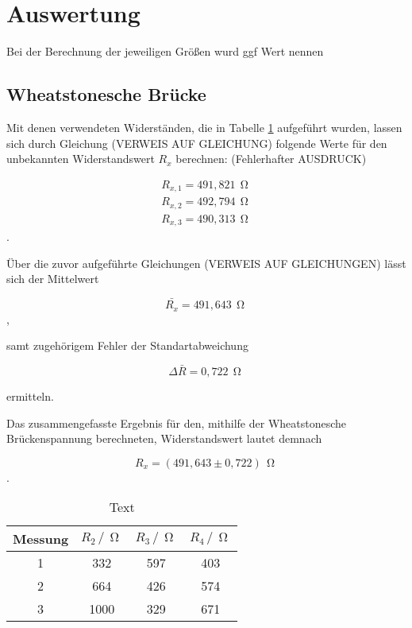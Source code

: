 \section{Auswertung}
\label{sec:Auswertung}

Bei der Berechnung der jeweiligen Größen wurd
ggf Wert nennen


\subsection{Wheatstonesche Brücke}

Mit denen verwendeten Widerständen, die in Tabelle \ref{tab:1} aufgeführt wurden, 
lassen sich durch Gleichung (VERWEIS AUF GLEICHUNG) folgende Werte für den 
unbekannten Widerstandswert $R_{x}$ berechnen:
(Fehlerhafter AUSDRUCK)

\begin{align}
R_{x,1} = 491,821\,\upOmega \nonumber \\
R_{x,2} = 492,794\,\upOmega \nonumber \\
R_{x,3} = 490,313\,\upOmega \nonumber 
\end{align}.



\noindent
Über die zuvor aufgeführte Gleichungen (VERWEIS AUF GLEICHUNGEN) lässt sich der  
Mittelwert 

\begin{equation}
\bar{R_{x}} = 491,643\,\upOmega \nonumber
\end{equation}, 

\noindent
samt zugehörigem Fehler der Standartabweichung

\begin{equation}
\Delta\bar{R} = 0,722\, \upOmega \nonumber
\end{equation}

\noindent 
ermitteln.

\noindent
Das zusammengefasste Ergebnis für den, mithilfe der Wheatstonesche Brückenspannung berechneten, Widerstandswert
lautet demnach

\begin{equation}
R_{x} = (491,643 \pm 0,722)\,  \upOmega \nonumber
\end{equation}.
    
\begin{table}
\normalsize

\centering
{}
\begin{tabular}{c c c c}
\toprule
        Messung & $R_{2} \,/\,\upOmega$ & $R_{3} \,/\,\upOmega$ & $R_{4} \,/\,\upOmega$ \\
        \midrule
        1 & 332 & 597 & 403  \\
        2 & 664 & 426 & 574  \\
        3 & 1000 & 329 & 671 \\ 

\bottomrule

\end{tabular}

\caption{Text}
\label{tab:1}
\end{table}



